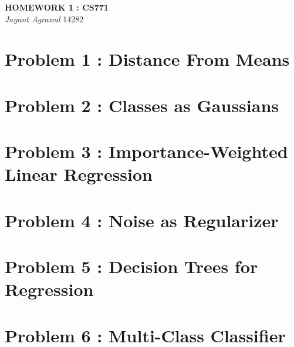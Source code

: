\documentclass{article}
\begin{document}

\begin{center}
\textbf{\Large HOMEWORK 1 : CS771} \\
\textit{\large Jayant Agrawal}         14282
\end{center}

\section{Problem 1 : Distance From Means}
\section{Problem 2 : Classes as Gaussians}
\section{Problem 3 : Importance-Weighted Linear Regression}
\section{Problem 4 : Noise as Regularizer}
\section{Problem 5 : Decision Trees for Regression}
\section{Problem 6 : Multi-Class Classifier}
\end{document}
